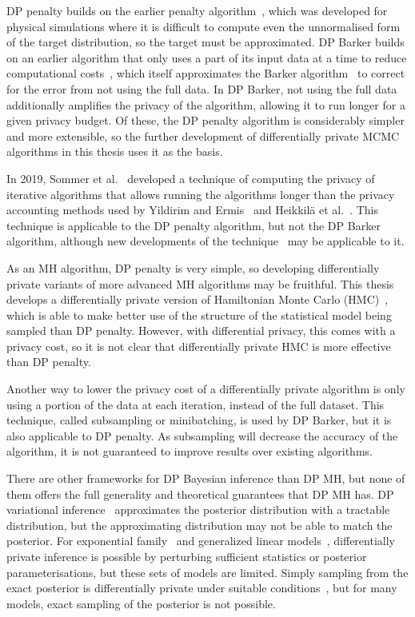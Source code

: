 \documentclass[english,twoside,openright]{HYgraduMLDS}
\begin{document}
DP penalty builds on the earlier penalty algorithm~\cite{CeD99}, which was
developed for physical simulations where it is difficult to compute even the
unnormalised form of the target distribution, so the target
must be approximated. DP Barker builds on an earlier algorithm that only
uses a part of its input data at a time to reduce computational
costs~\cite{SPC17}, which itself approximates the Barker algorithm~\cite{Barker65}
to correct for the error from not using the full data. In DP Barker, not using the
full data additionally amplifies the privacy of the algorithm,
allowing it to run longer for a given privacy budget.
Of these, the DP penalty algorithm is considerably simpler and more extensible,
so the further development of differentially private MCMC algorithms in this
thesis uses it as the basis.

In 2019, Sommer et al.~\cite{Sommer2019} developed a technique of
computing the privacy of
iterative algorithms that allows running the algorithms longer than the
privacy accounting methods used by Yildirim and Ermis~\cite{YildirimE19} and
Heikkilä et al.~\cite{HeikkilaJDH19}. This technique is applicable to the
DP penalty algorithm, but not the DP Barker algorithm, although new developments
of the technique~\cite{KJH20} may be applicable to it.

As an MH algorithm, DP penalty is very simple, so developing differentially
private variants of more advanced MH algorithms may be fruithful. This thesis
develops a differentially private version of
Hamiltonian Monte Carlo (HMC)~\cite{neal2012mcmc, DKP87}, which is able to make
better use of the structure of the statistical model being sampled than DP penalty.
However, with differential privacy, this comes with a privacy cost, so it is
not clear that differentially private HMC is more effective than DP penalty.

Another way to lower the privacy cost of a differentially private
algorithm is only using a portion of the data at each iteration, instead of
the full dataset. This technique, called subsampling or minibatching, is used
by DP Barker, but it is also applicable to DP penalty. As subsampling will
decrease the accuracy of the algorithm, it is not guaranteed to improve results
over existing algorithms.

There are other frameworks for DP Bayesian inference than DP MH, but none
of them offers the full generality and theoretical guarantees that DP MH
has. DP variational inference~\cite{JHD17} approximates the posterior
distribution with a tractable distribution, but the approximating distribution
may not be able to match the posterior. For exponential
family~\cite{BernsteinS18} and generalized linear models~\cite{KJK20},
differentially private inference is possible by perturbing sufficient statistics
or posterior parameterisations, but these sets of models are limited. Simply sampling
from the exact posterior is differentially private under suitable
conditions~\cite{DNZ17, WFS15, ZRD16}, but for many models, exact sampling of the posterior
is not possible.
\end{document}
